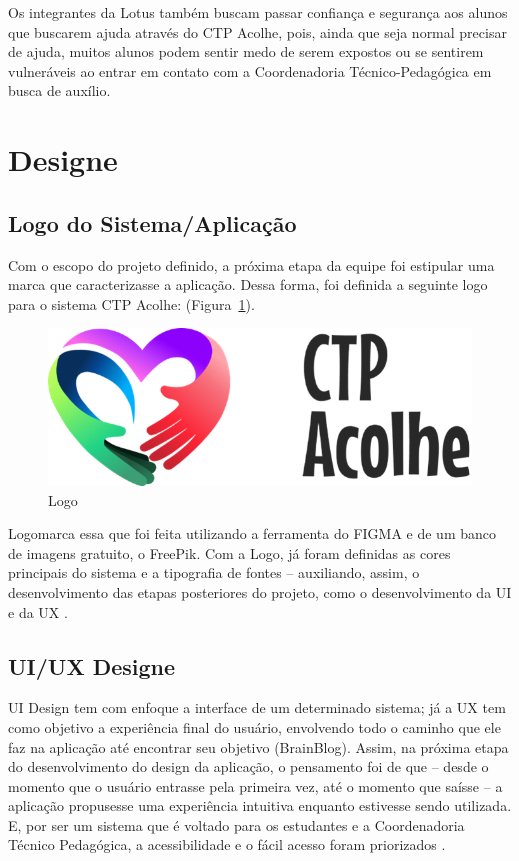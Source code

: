 \documentclass[12pt,a4paper]{article}
\begin{document}
Os integrantes da Lotus também buscam passar confiança e segurança aos alunos que buscarem ajuda através do CTP Acolhe, pois, ainda que seja normal precisar de ajuda, muitos alunos podem sentir medo de serem expostos ou se sentirem vulneráveis ao entrar em contato com a Coordenadoria Técnico-Pedagógica em busca de auxílio. 

\section{Designe}
\subsection{Logo do Sistema/Aplicação}
Com o escopo do projeto definido, a próxima etapa da equipe foi estipular uma marca que caracterizasse  a aplicação. 
Dessa forma, foi definida a seguinte logo para o sistema CTP Acolhe: (Figura~\ref{ft01}).

\begin{figure}[H]
    \centering
     \includegraphics[width=12cm]{ft.png}
    \caption{Logo}
    \label{ft01}
\end{figure}

Logomarca essa que foi feita utilizando a ferramenta do FIGMA e de um banco de imagens gratuito, o FreePik. Com a Logo, já foram definidas as cores principais do sistema e a tipografia de fontes – auxiliando, assim, o desenvolvimento das etapas posteriores do projeto, como o desenvolvimento da UI e da UX \cite{aela}.

\subsection{UI/UX Designe}
UI Design tem com enfoque a interface de um determinado sistema; já a UX tem como objetivo a experiência final do usuário, envolvendo todo o caminho que ele faz na aplicação até encontrar seu objetivo (BrainBlog).
Assim, na próxima etapa do desenvolvimento do design da aplicação, o pensamento foi de que – desde o momento que o usuário entrasse pela primeira vez, até o momento que saísse – a aplicação propusesse uma experiência intuitiva enquanto estivesse sendo utilizada. E, por ser um sistema que é voltado para os estudantes e a Coordenadoria Técnico Pedagógica, a acessibilidade e o fácil acesso foram priorizados \cite{aela}.
\end{document}
